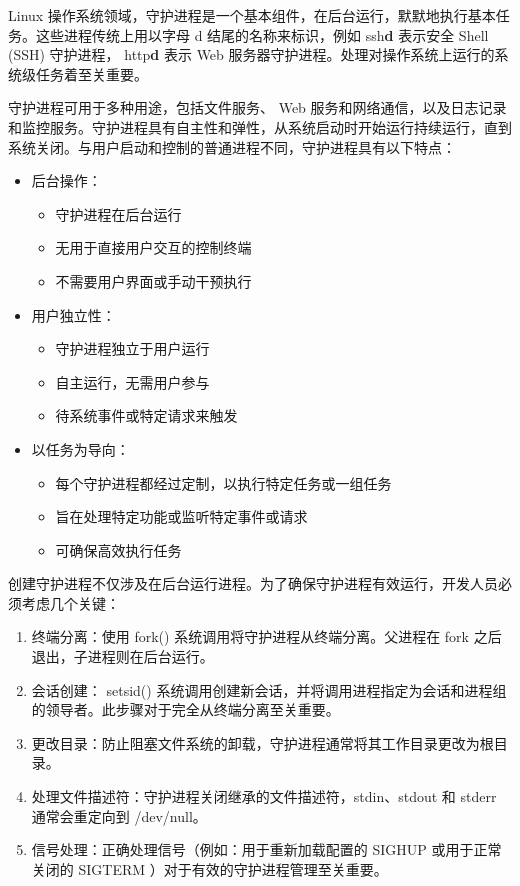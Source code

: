 Linux 操作系统领域，守护进程是一个基本组件，在后台运行，默默地执行基本任务。这些进程传统上用以字母 d 结尾的名称来标识，例如 ssh\textbf{d} 表示安全 Shell (SSH) 守护进程， http\textbf{d} 表示 Web 服务器守护进程。处理对操作系统上运行的系统级任务着至关重要。

守护进程可用于多种用途，包括文件服务、 Web 服务和网络通信，以及日志记录和监控服务。守护进程具有自主性和弹性，从系统启动时开始运行持续运行，直到系统关闭。与用户启动和控制的普通进程不同，守护进程具有以下特点：

\begin{itemize}
\item
后台操作：
\begin{itemize}
\item
守护进程在后台运行

\item
无用于直接用户交互的控制终端

\item
不需要用户界面或手动干预执行
\end{itemize}

\item
用户独立性：
\begin{itemize}
\item
守护进程独立于用户运行

\item
自主运行，无需用户参与

\item
待系统事件或特定请求来触发
\end{itemize}

\item
以任务为导向：
\begin{itemize}
\item
每个守护进程都经过定制，以执行特定任务或一组任务

\item
旨在处理特定功能或监听特定事件或请求

\item
可确保高效执行任务
\end{itemize}
\end{itemize}

创建守护进程不仅涉及在后台运行进程。为了确保守护进程有效运行，开发人员必须考虑几个关键：

\begin{enumerate}
\item
终端分离：使用 fork() 系统调用将守护进程从终端分离。父进程在 fork 之后退出，子进程则在后台运行。

\item
会话创建： setsid() 系统调用创建新会话，并将调用进程指定为会话和进程组的领导者。此步骤对于完全从终端分离至关重要。

\item
更改目录：防止阻塞文件系统的卸载，守护进程通常将其工作目录更改为根目录。

\item
处理文件描述符：守护进程关闭继承的文件描述符，stdin、stdout 和 stderr 通常会重定向到 /dev/null。

\item
信号处理：正确处理信号（例如：用于重新加载配置的 SIGHUP 或用于正常关闭的 SIGTERM ）对于有效的守护进程管理至关重要。
\end{enumerate}

